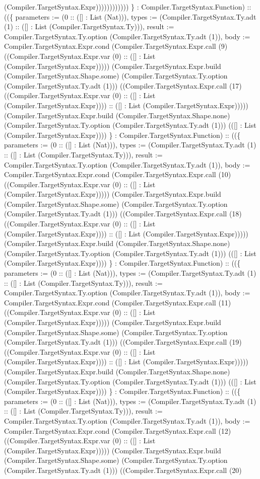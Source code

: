 \documentclass[11pt]{article}
\begin{document}
(Compiler.TargetSyntax.Expr)))))))))))) \} : Compiler.TargetSyntax.Function) :: ((\{ parameters := (0 :: ([] : List (Nat))), types := (Compiler.TargetSyntax.Ty.adt (1) :: ([] : List (Compiler.TargetSyntax.Ty))), result := Compiler.TargetSyntax.Ty.option (Compiler.TargetSyntax.Ty.adt (1)), body := Compiler.TargetSyntax.Expr.cond (Compiler.TargetSyntax.Expr.call (9) ((Compiler.TargetSyntax.Expr.var (0) :: ([] : List (Compiler.TargetSyntax.Expr))))) (Compiler.TargetSyntax.Expr.build (Compiler.TargetSyntax.Shape.some) (Compiler.TargetSyntax.Ty.option (Compiler.TargetSyntax.Ty.adt (1))) ((Compiler.TargetSyntax.Expr.call (17) ((Compiler.TargetSyntax.Expr.var (0) :: ([] : List (Compiler.TargetSyntax.Expr)))) :: ([] : List (Compiler.TargetSyntax.Expr))))) (Compiler.TargetSyntax.Expr.build (Compiler.TargetSyntax.Shape.none) (Compiler.TargetSyntax.Ty.option (Compiler.TargetSyntax.Ty.adt (1))) (([] : List (Compiler.TargetSyntax.Expr)))) \} : Compiler.TargetSyntax.Function) :: ((\{ parameters := (0 :: ([] : List (Nat))), types := (Compiler.TargetSyntax.Ty.adt (1) :: ([] : List (Compiler.TargetSyntax.Ty))), result := Compiler.TargetSyntax.Ty.option (Compiler.TargetSyntax.Ty.adt (1)), body := Compiler.TargetSyntax.Expr.cond (Compiler.TargetSyntax.Expr.call (10) ((Compiler.TargetSyntax.Expr.var (0) :: ([] : List (Compiler.TargetSyntax.Expr))))) (Compiler.TargetSyntax.Expr.build (Compiler.TargetSyntax.Shape.some) (Compiler.TargetSyntax.Ty.option (Compiler.TargetSyntax.Ty.adt (1))) ((Compiler.TargetSyntax.Expr.call (18) ((Compiler.TargetSyntax.Expr.var (0) :: ([] : List (Compiler.TargetSyntax.Expr)))) :: ([] : List (Compiler.TargetSyntax.Expr))))) (Compiler.TargetSyntax.Expr.build (Compiler.TargetSyntax.Shape.none) (Compiler.TargetSyntax.Ty.option (Compiler.TargetSyntax.Ty.adt (1))) (([] : List (Compiler.TargetSyntax.Expr)))) \} : Compiler.TargetSyntax.Function) :: ((\{ parameters := (0 :: ([] : List (Nat))), types := (Compiler.TargetSyntax.Ty.adt (1) :: ([] : List (Compiler.TargetSyntax.Ty))), result := Compiler.TargetSyntax.Ty.option (Compiler.TargetSyntax.Ty.adt (1)), body := Compiler.TargetSyntax.Expr.cond (Compiler.TargetSyntax.Expr.call (11) ((Compiler.TargetSyntax.Expr.var (0) :: ([] : List (Compiler.TargetSyntax.Expr))))) (Compiler.TargetSyntax.Expr.build (Compiler.TargetSyntax.Shape.some) (Compiler.TargetSyntax.Ty.option (Compiler.TargetSyntax.Ty.adt (1))) ((Compiler.TargetSyntax.Expr.call (19) ((Compiler.TargetSyntax.Expr.var (0) :: ([] : List (Compiler.TargetSyntax.Expr)))) :: ([] : List (Compiler.TargetSyntax.Expr))))) (Compiler.TargetSyntax.Expr.build (Compiler.TargetSyntax.Shape.none) (Compiler.TargetSyntax.Ty.option (Compiler.TargetSyntax.Ty.adt (1))) (([] : List (Compiler.TargetSyntax.Expr)))) \} : Compiler.TargetSyntax.Function) :: ((\{ parameters := (0 :: ([] : List (Nat))), types := (Compiler.TargetSyntax.Ty.adt (1) :: ([] : List (Compiler.TargetSyntax.Ty))), result := Compiler.TargetSyntax.Ty.option (Compiler.TargetSyntax.Ty.adt (1)), body := Compiler.TargetSyntax.Expr.cond (Compiler.TargetSyntax.Expr.call (12) ((Compiler.TargetSyntax.Expr.var (0) :: ([] : List (Compiler.TargetSyntax.Expr))))) (Compiler.TargetSyntax.Expr.build (Compiler.TargetSyntax.Shape.some) (Compiler.TargetSyntax.Ty.option (Compiler.TargetSyntax.Ty.adt (1))) ((Compiler.TargetSyntax.Expr.call (20) 
\end{document}
